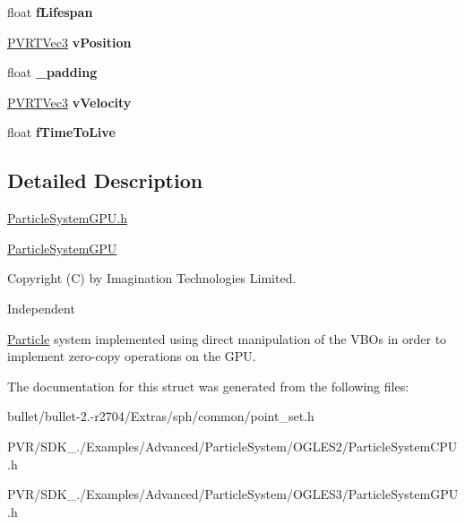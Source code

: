 \begin{DoxyCompactItemize}
\item 
\hypertarget{struct_particle_a9d590153f920b95c7ff3d595e5733026}{float {\bfseries f\+Lifespan}}\label{struct_particle_a9d590153f920b95c7ff3d595e5733026}

\item 
\hypertarget{struct_particle_a9367dd5c6285155aaa706cb9d038b6b6}{\hyperlink{struct_p_v_r_t_vec3}{P\+V\+R\+T\+Vec3} {\bfseries v\+Position}}\label{struct_particle_a9367dd5c6285155aaa706cb9d038b6b6}

\item 
\hypertarget{struct_particle_ae4ef0b0ab8e0f4246b80aabc59ae7dc6}{float {\bfseries \+\_\+padding}}\label{struct_particle_ae4ef0b0ab8e0f4246b80aabc59ae7dc6}

\item 
\hypertarget{struct_particle_ada2e3c3f97c8f7734d243851cd9322e0}{\hyperlink{struct_p_v_r_t_vec3}{P\+V\+R\+T\+Vec3} {\bfseries v\+Velocity}}\label{struct_particle_ada2e3c3f97c8f7734d243851cd9322e0}

\item 
\hypertarget{struct_particle_a6e32073bc4c855b3a8a58d152058e704}{float {\bfseries f\+Time\+To\+Live}}\label{struct_particle_a6e32073bc4c855b3a8a58d152058e704}

\end{DoxyCompactItemize}


\subsection{Detailed Description}


  \hyperlink{_particle_system_g_p_u_8h_source}{Particle\+System\+G\+P\+U.\+h}

\hyperlink{class_particle_system_g_p_u}{Particle\+System\+G\+P\+U}

Copyright (C) by Imagination Technologies Limited.

Independent

\hyperlink{struct_particle}{Particle} system implemented using direct manipulation of the V\+B\+Os in order to implement zero-\/copy operations on the G\+P\+U. 

The documentation for this struct was generated from the following files\+:\begin{DoxyCompactItemize}
\item 
bullet/bullet-\/2.-\/r2704/\+Extras/sph/common/point\+\_\+set.\+h\item 
P\+V\+R/\+S\+D\+K\+\_./\+Examples/\+Advanced/\+Particle\+System/\+O\+G\+L\+E\+S2/Particle\+System\+C\+P\+U.\+h\item 
P\+V\+R/\+S\+D\+K\+\_./\+Examples/\+Advanced/\+Particle\+System/\+O\+G\+L\+E\+S3/Particle\+System\+G\+P\+U.\+h\end{DoxyCompactItemize}
